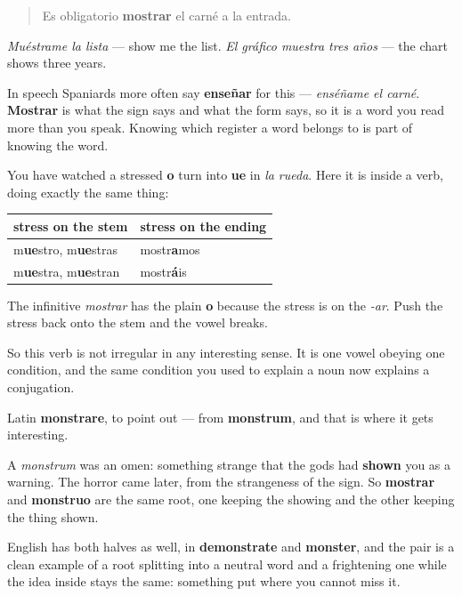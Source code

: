 \begin{quote}
Es obligatorio \textbf{mostrar} el carné a la entrada.
\end{quote}

\emph{Muéstrame la lista} — show me the list. \emph{El gráfico muestra tres años} — the chart shows three years.

In speech Spaniards more often say \textbf{enseñar} for this — \emph{enséñame el carné}. \textbf{Mostrar} is what the sign says and what the form says, so it is a word you read more than you speak. Knowing which register a word belongs to is part of knowing the word.

\begin{grammarlens}[title={Grammar Lens: the o that breaks again}]
You have watched a stressed \textbf{o} turn into \textbf{ue} in \emph{la rueda}. Here it is inside a verb, doing exactly the same thing:

\noindent
\begin{tabularx}{\linewidth}{@{}>{\raggedright\arraybackslash}X>{\raggedright\arraybackslash}X@{}}
\toprule
\textbf{stress on the stem} & \textbf{stress on the ending} \\
\midrule
m\textbf{ue}stro, m\textbf{ue}stras & mostr\textbf{a}mos \\
m\textbf{ue}stra, m\textbf{ue}stran & mostr\textbf{á}is \\
\bottomrule
\end{tabularx}

The infinitive \emph{mostrar} has the plain \textbf{o} because the stress is on the \emph{-ar}. Push the stress back onto the stem and the vowel breaks.

So this verb is not irregular in any interesting sense. It is one vowel obeying one condition, and the same condition you used to explain a noun now explains a conjugation.
\end{grammarlens}

\begin{cousinweb}
Latin \textbf{monstrare}, to point out — from \textbf{monstrum}, and that is where it gets interesting.

A \emph{monstrum} was an omen: something strange that the gods had \textbf{shown} you as a warning. The horror came later, from the strangeness of the sign. So \textbf{mostrar} and \textbf{monstruo} are the same root, one keeping the showing and the other keeping the thing shown.

English has both halves as well, in \textbf{demonstrate} and \textbf{monster}, and the pair is a clean example of a root splitting into a neutral word and a frightening one while the idea inside stays the same: something put where you cannot miss it.
\end{cousinweb}

